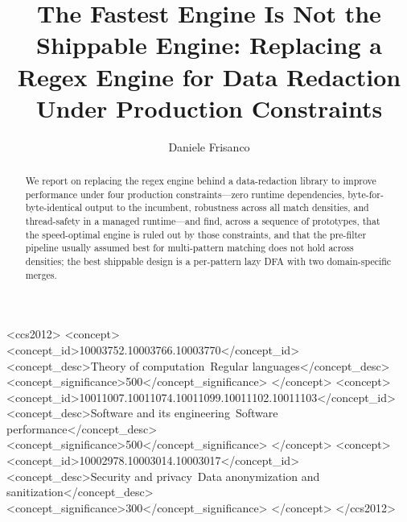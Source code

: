 \documentclass[acmsmall,nonacm,screen]{acmart}
\begin{document}
\title{The Fastest Engine Is Not the Shippable Engine: Replacing a
Regex Engine for Data Redaction Under Production Constraints}

\author{Daniele Frisanco}

\renewcommand{\shortauthors}{Frisanco}

\begin{abstract}
We report on replacing the regex engine behind a data-redaction library to
improve performance under four production constraints---zero runtime
dependencies, byte-for-byte-identical output to the incumbent, robustness across
all match densities, and thread-safety in a managed runtime---and find, across a
sequence of prototypes, that the speed-optimal engine is ruled out by those
constraints, and that the pre-filter pipeline usually assumed best for
multi-pattern matching does not hold across densities; the best shippable design
is a per-pattern lazy DFA with two domain-specific merges.
\end{abstract}

\begin{CCSXML}
<ccs2012>
   <concept>
       <concept_id>10003752.10003766.10003770</concept_id>
       <concept_desc>Theory of computation~Regular languages</concept_desc>
       <concept_significance>500</concept_significance>
       </concept>
   <concept>
       <concept_id>10011007.10011074.10011099.10011102.10011103</concept_id>
       <concept_desc>Software and its engineering~Software performance</concept_desc>
       <concept_significance>500</concept_significance>
       </concept>
   <concept>
       <concept_id>10002978.10003014.10003017</concept_id>
       <concept_desc>Security and privacy~Data anonymization and sanitization</concept_desc>
       <concept_significance>300</concept_significance>
       </concept>
 </ccs2012>
\end{CCSXML}

\end{document}
